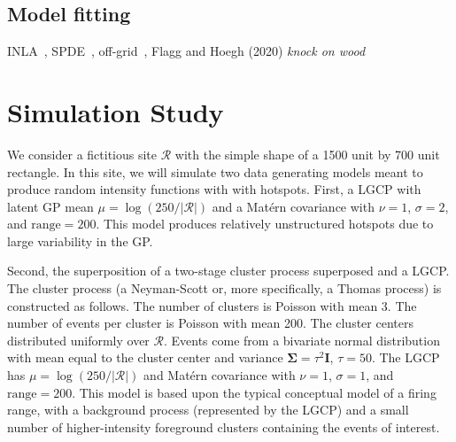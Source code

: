 \documentclass[review]{elsarticle}
\begin{document}


\subsection{Model fitting}

INLA~\citep{rueetal}, SPDE~\citep{lindgrenetal}, off-grid~\citep{simpsonetal},
Flagg and Hoegh (2020) \emph{knock on wood}


\section{Simulation Study}

We consider a fictitious site \(\mathcal{R}\) with the simple shape of a 1500
unit by 700 unit rectangle. In this site, we will simulate two data generating
models meant to produce random intensity functions with with hotspots. First,
a LGCP with latent GP mean \(\mu = \log(250 / |\mathcal{R}|)\) and a
Mat\'{e}rn covariance with \(\nu = 1\), \(\sigma = 2\), and
\(\text{range} = 200\). This model produces relatively unstructured hotspots
due to large variability in the GP.

Second, the superposition of a two-stage cluster process superposed and a
LGCP. The cluster process (a Neyman-Scott or, more specifically, a Thomas
process) is constructed as follows. The number of clusters is Poisson with
mean 3. The number of events per cluster is Poisson with mean 200. The cluster
centers distributed uniformly over \(\mathcal{R}\). Events come from a
bivariate normal distribution with mean equal to the cluster center and
variance \(\boldsymbol{\Sigma} = \tau^{2}\mathbf{I}\), \(\tau = 50\). The LGCP
has \(\mu = \log(250 / |\mathcal{R}|)\) and Mat\'{e}rn covariance with
\(\nu = 1\), \(\sigma = 1\), and \(\text{range} = 200\). This model is based
upon the typical conceptual model of a firing range, with a background process
(represented by the LGCP) and a small number of higher-intensity foreground
clusters containing the events of interest.
\end{document}
